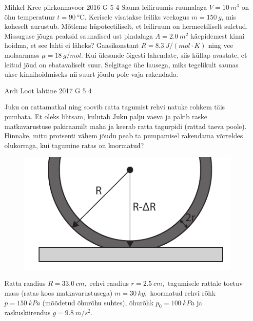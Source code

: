 \documentclass[11pt, twoside]{article}
\begin{document}
{%
{Mihkel Kree} %
{piirkonnavoor} %
{2016} %
{G 5} %
{4} %
{
\ifStatement
Sauna leiliruumis ruumalaga $V=\SI{10}{m^3}$ on õhu temperatuur $t=\SI{90}{\celsius}$. Kerisele visatakse leiliks veekogus $m=\SI{150}{g}$, mis koheselt aurustub. Mõtleme hüpoteetiliselt, et leiliruum on hermeetiliselt suletud. Missuguse jõuga peaksid saunalised ust pindalaga $A=\SI{2,0}{m^2}$ käepidemest kinni hoidma, et see lahti ei läheks? Gaasikonstant $R=\SI{8.3}{J \per (mol\!\cdot\! K)}$ ning vee molaarmass $\mu=\SI{18}{g\per mol}$. Kui ülesande õigesti lahendate, siis küllap avastate, et leitud jõud on ebatavaliselt suur. Selgitage ühe lausega, miks tegelikult saunas ukse kinnihoidmiseks nii suurt jõudu pole vaja rakendada.
\fi
}

{Ardi Loot} %
{lahtine} %
{2017} %
{G 5} %
{4} %
{
\ifStatement
Juku on rattamatkal ning soovib ratta tagumist rehvi natuke rohkem
täis pumbata. Et oleks lihtsam, kulutab Juku palju vaeva ja pakib
raske matkavarustuse pakiraamilt maha ja keerab ratta tagurpidi (rattad
taeva poole). Hinnake, mitu protsenti vähem jõudu peab ta pumpamisel
rakendama võrreldes olukorraga, kui tagumine ratas on koormatud?

\begin{figure}
	\vspace{-15pt}
	\includegraphics[width=\linewidth]{2017-lahg-05-fig_rattakumm.pdf}
\end{figure}

Ratta raadius $R=\SI{33.0}{cm},$ rehvi raadius $r=\SI{2.5}{cm},$
tagumisele rattale toetuv mass (ratas koos matkavarustusega) $m=\SI{30}{kg},$
koormatud rehvi rõhk $p=\SI{150}{kPa}$ (mõõdetud õhurõhu suhtes), õhurõhk $p_{0}=\SI{100}{kPa}$
ja raskuskiirendus $g=\SI{9.8}{m/s^{2}}.$ 

}}
\end{document}
